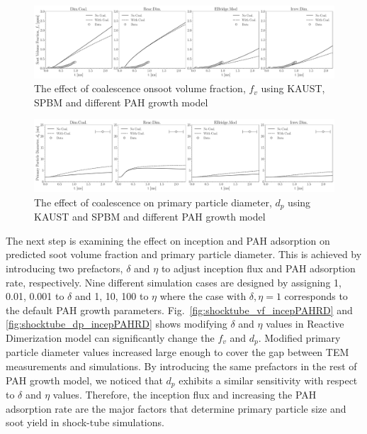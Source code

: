 \begin{figure}[H]
	\centering
	\includegraphics[width=1\textwidth]{Figures/Results/Shocktube/Stanford/TEM/10CH4_TEM_vf_coalesens.pdf}
	\caption{The effect of coalescence onsoot volume fraction, $f_v$ using KAUST, SPBM and different PAH growth model}
	\label{fig:shocktube_vf_coaleffect} 
\end{figure}


\begin{figure}[H]
	\centering
	\includegraphics[width=1\textwidth]{Figures/Results/Shocktube/Stanford/TEM/10CH4_TEM_dp_coalesens.pdf}
	\caption{The effect of coalescence on primary particle diameter, $d_p$ using KAUST and SPBM and different PAH growth model}
	\label{fig:shocktube_dp_coaleffect} 
\end{figure}

The next step is examining the effect on inception and PAH adsorption on predicted soot volume fraction and primary particle diameter. This is achieved by introducing two prefactors, $\delta$ and $\eta$ to adjust inception flux and PAH adsorption rate, respectively. Nine different simulation cases are designed by assigning 1, 0.01, 0.001 to $\delta$ and 1, 10, 100 to $\eta$ where the case with $\delta, \eta=1$ corresponds to the default PAH growth parameters. Fig.~\ref{fig:shocktube_vf_incepPAHRD} and \ref{fig:shocktube_dp_incepPAHRD} shows modifying $\delta$ and $\eta$ values in Reactive Dimerization model can significantly change the $f_v$ and $d_p$. Modified primary particle diameter values increased large enough to cover the gap between TEM measurements and simulations. By introducing the same prefactors in the rest of PAH growth model, we noticed that $d_p$ exhibits a similar sensitivity with respect to $\delta$ and $\eta$ values. Therefore, the inception flux and increasing the PAH adsorption rate are the major factors that determine primary particle size and soot yield in shock-tube simulations.


